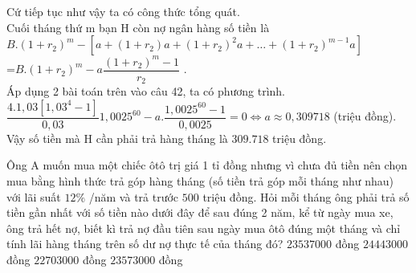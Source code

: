 \begin{ex}
{        Cứ tiếp tục như vậy ta có công thức tổng quát.\\
        Cuối tháng thứ m bạn H còn nợ ngân hàng số tiền là\\
        $B.\left(1+r_2\right)^m-\left[a+\left(1+r_2\right)a+\left(1+r_2\right)^2a+\ldots+\left(1+r_2\right)^{m-1}a\right]$\\
        =$B.\left(1+r_2\right)^m-a\dfrac{\left(1+r_2\right)^m-1}{r_2}$ .\\
        Áp dụng 2 bài toán trên vào câu 42, ta có phương trình.\\
        $\dfrac{4.1,03\left[1,03^4-1\right]}{0,03}{1,0025^{60}}-a.\dfrac{1,0025^{60}-1}{0,0025}=0\Leftrightarrow a\approx 0,309718$ (triệu đồng).\\
        Vậy số tiền mà H cần phải trả hàng tháng là $309.718$ triệu đồng.
    }
\end{ex}
\begin{ex}%
    [Sở Phú Thọ 2019]%
    Ông A muốn mua một chiếc ôtô trị giá 1 tỉ đồng nhưng vì chưa đủ tiền nên chọn mua bằng hình thức trả góp hàng tháng (số tiền trả góp mỗi tháng như nhau) với lãi suất $12\%$ /năm và trả trước $500$ triệu đồng. Hỏi mỗi tháng ông phải trả số tiền gần nhất với số tiền nào dưới đây để sau đúng 2 năm, kể từ ngày mua xe, ông trả hết nợ, biết kì trả nợ đầu tiên sau ngày mua ôtô đúng một tháng và chỉ tính lãi hàng tháng trên số dư nợ thực tế của tháng đó?
    \choice
    {\True $ 23537000$ đồng}
    {$ 24{44}3000$ đồng}
    {$ 22703000$ đồng}
    {$ 23573000$ đồng}
\end{ex}
